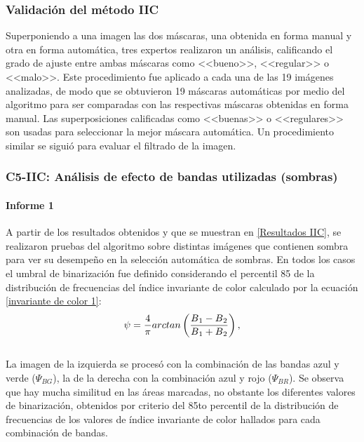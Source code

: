  

 


\subsubsection{Validación del método IIC} \label{Validacion}
Superponiendo a una imagen las dos máscaras, una obtenida en forma manual y otra en forma automática, tres expertos realizaron un análisis, calificando el grado de ajuste entre ambas máscaras como <<bueno>>, <<regular>> o <<malo>>. Este procedimiento fue aplicado a cada una de las 19 imágenes analizadas, de modo que se obtuvieron 19 máscaras automáticas por medio del algoritmo para ser comparadas con las respectivas máscaras obtenidas en forma manual. Las superposiciones calificadas como <<buenas>> o <<regulares>> son usadas para seleccionar la mejor máscara automática. Un procedimiento similar se siguió para evaluar el filtrado de la imagen.

\subsubsection{C5-IIC: Análisis de efecto de bandas utilizadas (sombras)} %
\paragraph{Informe 1}
A partir de los resultados obtenidos y que se muestran en \ref{Resultados IIC}, se realizaron pruebas del algoritmo sobre distintas imágenes que contienen sombra para ver su desempeño en la selección automática de sombras. En todos los casos el umbral de binarización fue definido considerando el percentil 85 de la distribución de frecuencias del índice invariante de color calculado por la ecuación \ref{invariante de color 1}:
\\
\begin{equation}
	\psi=\frac{4}{\pi} arctan\left(\frac{B\textsubscript{1}-B\textsubscript{2}}{B\textsubscript{1}+B\textsubscript{2}}\right),\label{invariante de color 1}
\end{equation}
\\
La imagen de la izquierda se procesó con la combinación de las bandas azul y verde ($\Psi_{BG}$), la de la derecha con la combinación azul y rojo ($\Psi_{BR}$).
Se observa que hay mucha similitud en las áreas marcadas, no obstante los diferentes valores de binarización, obtenidos por criterio del 85to percentil de la distribución de frecuencias de los valores de índice invariante de color hallados para cada combinación de bandas.
\\
\\
